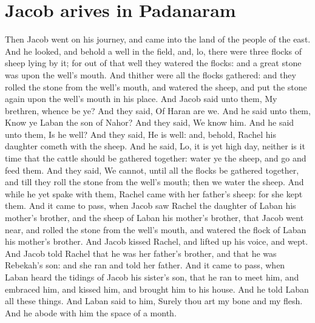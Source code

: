 \section*{Jacob arives in Padanaram}
\begin{biblechapter} %
\verse Then Jacob went on his journey, and came into the land of the people of the east.
\verse And he looked, and behold a well in the field, and, lo, there were three flocks of sheep lying by it; for out of that well they watered the flocks: and a great stone was upon the well's mouth.
\verse And thither were all the flocks gathered: and they rolled the stone from the well's mouth, and watered the sheep, and put the stone again upon the well's mouth in his place.
\verse And Jacob said unto them, My brethren, whence be ye? And they said, Of Haran are we.
\verse And he said unto them, Know ye Laban the son of Nahor? And they said, We know him.
\verse And he said unto them, Is he well? And they said, He is well: and, behold, Rachel his daughter cometh with the sheep.
\verse And he said, Lo, it is yet high day, neither is it time that the cattle should be gathered together: water ye the sheep, and go and feed them.
\verse And they said, We cannot, until all the flocks be gathered together, and till they roll the stone from the well's mouth; then we water the sheep.
\verse And while he yet spake with them, Rachel came with her father's sheep: for she kept them.
\verse And it came to pass, when Jacob saw Rachel the daughter of Laban his mother's brother, and the sheep of Laban his mother's brother, that Jacob went near, and rolled the stone from the well's mouth, and watered the flock of Laban his mother's brother.
\verse And Jacob kissed Rachel, and lifted up his voice, and wept.
\verse And Jacob told Rachel that he was her father's brother, and that he was Rebekah's son: and she ran and told her father.
\verse And it came to pass, when Laban heard the tidings of Jacob his sister's son, that he ran to meet him, and embraced him, and kissed him, and brought him to his house. And he told Laban all these things.
\verse And Laban said to him, Surely thou art my bone and my flesh. And he abode with him the space of a month.

\end{biblechapter}
